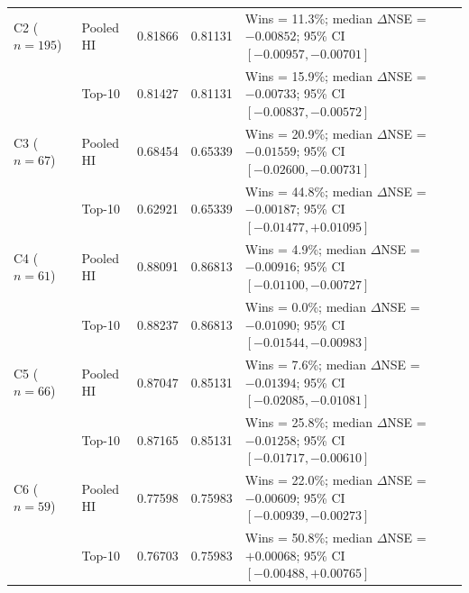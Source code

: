 \begin{table}[htbp]
\begin{tabular}{llccp{5.0cm}}
\addlinespace[2pt]

C2 ($n=195$)
& Pooled HI
& 0.81866
& 0.81131
& Wins = 11.3\%; median $\Delta$NSE = $-0.00852$;
95\% CI $[-0.00957,-0.00701]$ \\

& Top-10
& 0.81427
& 0.81131
& Wins = 15.9\%; median $\Delta$NSE = $-0.00733$;
95\% CI $[-0.00837,-0.00572]$ \\

\addlinespace[2pt]

C3 ($n=67$)
& Pooled HI
& 0.68454
& 0.65339
& Wins = 20.9\%; median $\Delta$NSE = $-0.01559$;
95\% CI $[-0.02600,-0.00731]$ \\

& Top-10
& 0.62921
& 0.65339
& Wins = 44.8\%; median $\Delta$NSE = $-0.00187$;
95\% CI $[-0.01477,+0.01095]$ \\

\addlinespace[2pt]

C4 ($n=61$)
& Pooled HI
& 0.88091
& 0.86813
& Wins = 4.9\%; median $\Delta$NSE = $-0.00916$;
95\% CI $[-0.01100,-0.00727]$ \\

& Top-10
& 0.88237
& 0.86813
& Wins = 0.0\%; median $\Delta$NSE = $-0.01090$;
95\% CI $[-0.01544,-0.00983]$ \\

\addlinespace[2pt]

C5 ($n=66$)
& Pooled HI
& 0.87047
& 0.85131
& Wins = 7.6\%; median $\Delta$NSE = $-0.01394$;
95\% CI $[-0.02085,-0.01081]$ \\

& Top-10
& 0.87165
& 0.85131
& Wins = 25.8\%; median $\Delta$NSE = $-0.01258$;
95\% CI $[-0.01717,-0.00610]$ \\

\addlinespace[2pt]

C6 ($n=59$)
& Pooled HI
& 0.77598
& 0.75983
& Wins = 22.0\%; median $\Delta$NSE = $-0.00609$;
95\% CI $[-0.00939,-0.00273]$ \\

& Top-10
& 0.76703
& 0.75983
& Wins = 50.8\%; median $\Delta$NSE = $+0.00068$;
95\% CI $[-0.00488,+0.00765]$ \\

\bottomrule
\end{tabular}
\end{table}

